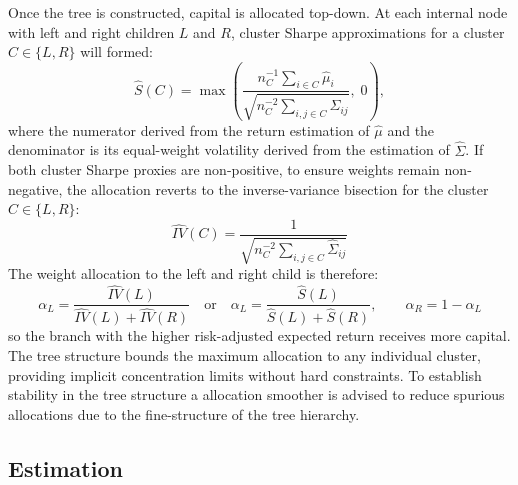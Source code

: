 \documentclass[12pt]{article}
\begin{document}
Once the tree is constructed, capital is allocated top-down. At each internal node with left and right children $L$ and $R$, cluster Sharpe approximations for a cluster $C\in\{L,R\}$ will formed:
\begin{equation}
  \hat{S}(C) = \max\!\left(
    \frac{n_C^{-1}\sum_{i \in C}\hat{\mu}_{i}}
         {\sqrt{n_C^{-2}\sum_{i,j \in C}\hat{\Sigma}_{ij}}},\; 0
  \right),
  \label{eq:sharpe-proxy}
\end{equation}
where the numerator derived from the return estimation of $\hat{\mu}$ and the denominator is its equal-weight volatility derived from the estimation of $\hat{\Sigma}$. If both cluster Sharpe proxies are non-positive, to ensure weights remain non-negative, the allocation reverts to the inverse-variance bisection for the cluster $C\in\{L,R\}$:
\begin{equation}
  \hat{IV}(C) = 
    \frac{1}
         {\sqrt{n_C^{-2}\sum_{i,j \in C}\hat{\Sigma}_{ij}}}
  \label{eq:inv_var}
\end{equation}
The weight allocation to the left and right child is therefore:
\begin{equation}
  \alpha_L = \frac{\hat{IV}(L)}{\hat{IV}(L)+\hat{IV}(R)} \quad \text{or} \quad
  \alpha_L = \frac{\hat{S}(L)}{\hat{S}(L)+\hat{S}(R)}, \qquad \alpha_R = 1-\alpha_L
  \label{eq:sharpe-alloc}
\end{equation}
so the branch with the higher risk-adjusted expected return receives more capital. The tree structure bounds the maximum allocation to any individual cluster, providing implicit concentration limits without hard constraints. To establish stability in the tree structure a allocation smoother is advised to reduce spurious allocations due to the fine-structure of the tree hierarchy.

\subsection{Estimation}
\end{document}
